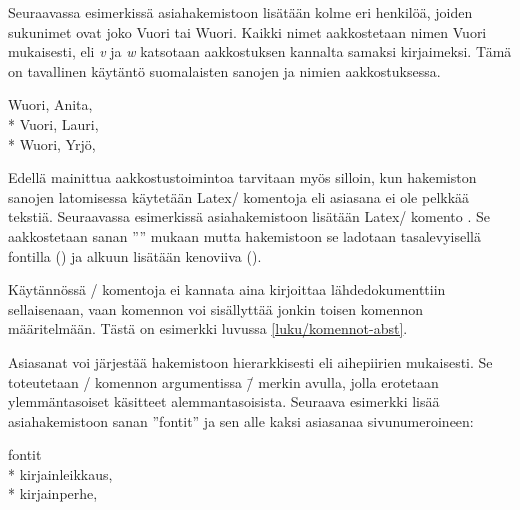 Seuraavassa esimerkissä asiahakemistoon lisätään kolme eri henkilöä,
joiden sukunimet ovat joko Vuori tai Wuori. Kaikki nimet aakkostetaan
nimen Vuori mukaisesti, eli \emph{v} ja \emph{w} katsotaan aakkostuksen
kannalta samaksi kirjaimeksi. Tämä on tavallinen käytäntö suomalaisten
sanojen ja nimien aakkostuksessa.

\begin{koodilohkosis}
\end{koodilohkosis}

\begin{tulossis}
  Wuori, Anita,  \\*
  Vuori, Lauri,  \\*
  Wuori, Yrjö, 
\end{tulossis}

\noindent
Edellä mainittua aakkostustoimintoa tarvitaan myös silloin, kun
hakemiston sanojen latomisessa käytetään Latex\-/ komentoja eli asiasana
ei ole pelkkää tekstiä. Seuraavassa esimerkissä asiahakemistoon lisätään
Latex\-/ komento . Se aakkostetaan sanan
'''' mukaan mutta hakemistoon se ladotaan
tasalevyisellä fontilla () ja alkuun lisätään kenoviiva
().

\begin{koodilohkosis}
\end{koodilohkosis}

\noindent
Käytännössä \-/ komentoja ei kannata aina kirjoittaa
lähdedokumenttiin sellaisenaan, vaan komennon voi sisällyttää jonkin
toisen komennon määritelmään. Tästä on esimerkki luvussa
\ref{luku/komennot-abst}.

Asiasanat voi järjestää hakemistoon hierarkkisesti eli aihepiirien
mukaisesti. Se toteutetaan \-/ komennon argumentissa
\koodi{!}\=/ merkin avulla, jolla erotetaan ylemmäntasoiset käsitteet
alemmantasoisista. Seuraava esimerkki lisää asiahakemistoon sanan
''fontit'' ja sen alle kaksi asiasanaa sivunumeroineen:

\begin{koodilohkosis}
\end{koodilohkosis}

\begin{tulossis}
  fontit \\*
  \makebox[\sisennys]{}kirjainleikkaus,  \\*
  \makebox[\sisennys]{}kirjainperhe, 
\end{tulossis}

